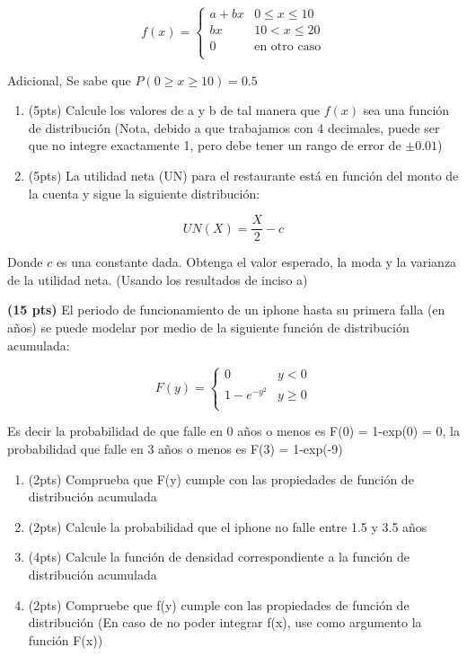 \documentclass[addpoints]{exam}
\theoremstyle{mytheor}
\begin{document}
\begin{questions}
\[   
f(x) = 
     \begin{cases}
       a+bx & 0 \leq x \leq 10\\
       bx & 10 < x \leq 20\\
       0 & \text{en otro caso} \\
     \end{cases}
\]

Adicional, Se sabe que $P(0 \geq x \geq 10) = 0.5$

\begin{enumerate}[label=\Alph*)]
\item (5pts) Calcule los valores de a y b de tal manera que $f(x)$ sea una función de distribución (Nota, debido a que trabajamos con 4 decimales, puede ser que no integre exactamente 1, pero debe tener un rango de error de $\pm 0.01$)
\item (5pts) La utilidad neta (UN) para el restaurante está en función del monto de la cuenta y sigue la siguiente distribución: 
\end{enumerate}
$$ UN(X) = \frac{X}{2}-c $$
 
Donde $c$ es una constante dada. Obtenga el valor esperado, la moda y la varianza de la utilidad neta. (Usando los resultados de inciso a)

\question \textbf{(15 pts)}
El periodo de funcionamiento de un iphone hasta su primera falla (en años) se puede modelar por medio de la siguiente función de distribución acumulada:

\[   
F(y) = 
     \begin{cases}
       0 & y<0\\
      1-e^{-y^2} & y \geq 0 \\
     \end{cases}
\]

Es decir la probabilidad de que falle en 0 años o menos es F(0) = 1-exp(0) = 0, la probabilidad que falle en 3 años o menos es F(3) = 1-exp(-9)

\begin{enumerate}[label=\Alph*)]
\item (2pts) Comprueba que F(y) cumple con las propiedades de función de distribución acumulada
\item (2pts) Calcule la probabilidad que el iphone no falle entre 1.5 y 3.5 años
\item (4pts) Calcule la función de densidad correspondiente a la función de distribución acumulada
\item (2pts) Compruebe que f(y) cumple con las propiedades de función de distribución (En caso de no poder integrar f(x), use como argumento la función F(x))
\end{enumerate}


\end{questions} 
\end{document}
